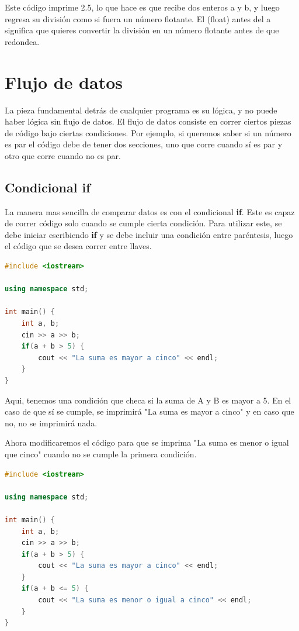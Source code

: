 \documentclass{article}
\begin{document}
Este código imprime 2.5, lo que hace es que recibe dos enteros a y b, y luego regresa su división como si fuera un número flotante. El (float) antes del a significa que quieres convertir la división en un número flotante antes de que redondea.

\section{Flujo de datos}

La pieza fundamental detrás de cualquier programa es su lógica, y no puede haber lógica sin flujo de datos. El flujo de datos consiste en correr ciertos piezas de código bajo ciertas condiciones. Por ejemplo, si queremos saber si un número es par el código debe de tener dos secciones, uno que corre cuando sí es par y otro que corre cuando no es par.

\subsection{Condicional if}

La manera mas sencilla de comparar datos es con el condicional \textbf{if}. Este es capaz de correr código solo cuando se cumple cierta condición. Para utilizar este, se debe iniciar escribiendo \textbf{if} y se debe incluir una condición entre paréntesis, luego el código que se desea correr entre llaves.

\begin{lstlisting}[language=C++, caption=Condiciones]
#include <iostream>

using namespace std;

int main() {
    int a, b;
    cin >> a >> b;
    if(a + b > 5) {
        cout << "La suma es mayor a cinco" << endl;
    }
}
\end{lstlisting}

Aqui, tenemos una condición que checa si la suma de A y B es mayor a 5. En el caso de que sí se cumple, se imprimirá "La suma es mayor a cinco" y en caso que no, no se imprimirá nada.

Ahora modificaremos el código para que se imprima "La suma es menor o igual que cinco" cuando no se cumple la primera condición.

\begin{lstlisting}[language=C++, caption=Condiciones]
#include <iostream>

using namespace std;

int main() {
    int a, b;
    cin >> a >> b;
    if(a + b > 5) {
        cout << "La suma es mayor a cinco" << endl;
    }
    if(a + b <= 5) {
        cout << "La suma es menor o igual a cinco" << endl;
    }
}
\end{lstlisting}
\end{document}
